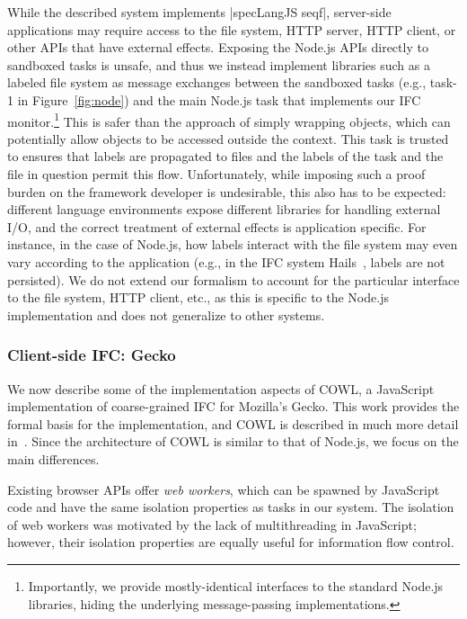 While the described system implements |specLangJS seqf|, server-side
applications may require access to the file system, HTTP server, HTTP
client, or other APIs that have external effects.
%
Exposing the Node.js APIs directly to sandboxed tasks is unsafe, and
thus we
%
instead implement libraries such as a labeled file system as
message exchanges between the sandboxed tasks (e.g., \textsf{task-1}
in Figure~\ref{fig:node}) and the main Node.js task that implements
our IFC monitor.\footnote{
  Importantly, we provide mostly-identical interfaces to
  the standard Node.js libraries, hiding the underlying
  message-passing implementations.
}
%
This is safer than the approach of simply wrapping objects, which can
potentially allow objects to be accessed outside the context.
%
This task is trusted to ensures that labels are
propagated to files and the labels of the task and the file in question permit
this flow.
%
Unfortunately, while imposing such a proof burden on the
framework developer is undesirable, this also has to be expected:
different language environments expose different libraries for
handling external I/O, and the correct treatment of external effects
is application specific.
%
For instance, in the case of Node.js, how labels interact with the
file system may even vary according to the application (e.g.,
in the IFC system Hails~\cite{hails}, labels are not persisted).
%
%
We do not extend our formalism to account for the  particular
interface to the file system, HTTP client, etc., as this is
specific to the Node.js implementation and does not generalize
to other systems.


\subsubsection{Client-side IFC: Gecko}

We now describe some of the implementation aspects of
COWL, a JavaScript implementation of coarse-grained
IFC for Mozilla's Gecko.  This work provides the formal basis for
the implementation, and COWL is described in much more detail in~\cite{swapi}.
%
Since the architecture of COWL is similar to that of Node.js, we focus
on the main differences.

%
Existing browser APIs offer \emph{web workers}, which can
be spawned by JavaScript code and have
the same isolation properties as tasks in our system.
%
The isolation of web workers was motivated by the lack of multithreading
in JavaScript; however, their isolation properties are equally useful for information
flow control.

